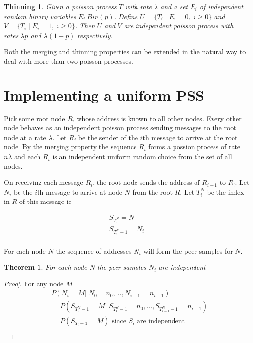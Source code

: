 \documentclass[a4paper,10pt]{article}
\newtheorem*{thm}{Theorem}
\begin{document}
\newtheorem*{thinning}{Thinning}
\begin{thinning}
Given a poisson process $T$ with rate $\lambda$ and a set $E_i$ of independent random binary variables $E_i ~ Bin(p)$. Define $U = \{T_i \;|\; E_i = 0, \; i \geq 0\}$ and $V = \{T_i \;|\; E_i = 1, \; i \geq 0\}$. Then $U$ and $V$ are independent poisson process with rates $\lambda p$ and $\lambda (1-p)$ respectively.
\end{thinning}

Both the merging and thinning properties can be extended in the natural way to deal with more than two poisson processes.

\section{Implementing a uniform PSS}

Pick some root node $R$, whose address is known to all other nodes. Every other node behaves as an independent poisson process sending messages to the root node at a rate $\lambda$. Let $R_i$ be the sender of the $i$th message to arrive at the root node. By the merging property the sequence $R_i$ forms a possion process of rate $n \lambda$ and each $R_i$ is an independent uniform random choice from the set of all nodes.

On receiving each message $R_i$, the root node sends the address of $R_{i-1}$ to $R_i$. Let $N_i$ be the $i$th message to arrive at node $N$ from the root $R$. Let $T^N_i$ be the index in $R$ of this message ie

\begin{gather*}
S_{T^N_i} = N \\
S_{T^N_i-1} = N_i \\
\end{gather*}

For each node $N$ the sequence of addresses $N_i$ will form the peer samples for $N$.

\begin{thm}For each node $N$ the peer samples $N_i$ are independent\end{thm}

\begin{proof}
For any node $M$
\begin{align*}
& \!\!\! P(N_i = M |\; N_0=n_0, ... ,N_{i-1} = n_{i-1}) \\
& = P(S_{T^N_i-1} = M |\; S_{T^N_0-1} = n_0, ... ,S_{T^N_{i-1}-1} = n_{i-1}) \\
& = P(S_{T_i-1} = M) \text{ since $S_i$ are independent} \\
\end{align*}
\end{proof}
\end{document}
